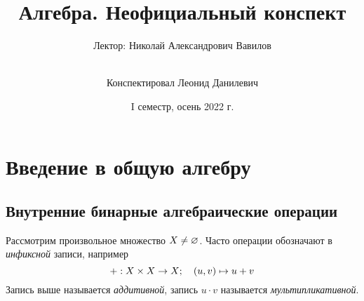 \documentclass[a4paper]{report}
\date{I семестр, осень 2022 г.}
\title{Алгебра. Неофициальный конспект}
\author{Лектор: Николай Александрович Вавилов \and \\ Конспектировал Леонид Данилевич}
\begin{document}
    \maketitle
    \tableofcontents
    \newpage
    \setcounter{lection}{0}


    \chapter{Введение в общую алгебру}


    \section{Внутренние бинарные алгебраические операции}
    Рассмотрим произвольное множество $X \ne \varnothing$.
    Часто операции обозначают в \emph{инфиксной} записи, например \[+: X \times X \rightarrow X; \quad(u, v) \mapsto u + v\]
    Запись выше называется \emph{аддитивной}, запись $u \cdot v$ называется \emph{мультипликативной}.
\end{document}
